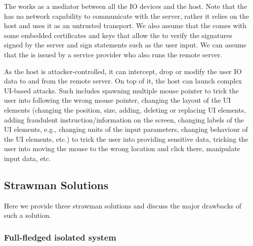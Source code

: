 The \device works as a mediator between all the IO devices and the host. Note that the \device has no network capability to communicate with the server, rather it relies on the host and uses it as an untrusted transport. We also assume that the \device comes with some embedded certificates and keys that allow the \device to verify the signatures signed by the server and sign statements such as the user input. We can assume that the \device is issued by a service provider who also runs the remote server.

 As the host is attacker-controlled, it can intercept, drop or modify the user IO data to and from the remote server. On top of it, the host can launch complex UI-based attacks. Such includes spawning multiple mouse pointer to trick the user into following the wrong mouse pointer, changing the layout of the UI elements (changing the position, size, adding, deleting or replacing UI elements, adding fraudulent instruction/information on the screen, changing labels of the UI elements, e.g., changing units of the input parameters, changing behaviour of the UI elements, etc.) to trick the user into providing sensitive data, tricking the user into moving the mouse to the wrong location and click there, manipulate input data, etc.

\iffalse
\begin{figure}[t]
\centering
\texttt{[image: screenPartition.pdf]}
\caption{\textbf{\device's pointer tracking, pointer \& UI overlay, and security properties.} Our proposed method provides two layers of protection for IO to the user. 1. In all the parts of the screen, the \device provide pointer integrity (the gray part). 2. The green part of the screen where the \device overlays on the HDMI stream where the \device provide integrity and privacy (privacy is dependent on the application requirements) for the IO.}
\spacesave
\label{fig:screenPartition}
\centering
\end{figure}
\fi


\subsection{Strawman Solutions}
\label{sec:approach:strawman}

Here we provide three strawman solutions and discuss the major drawbacks of such a solution.

\subsubsection{\bfseries Full-fledged isolated system}
\label{sec:approach:strawman:1}

